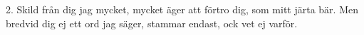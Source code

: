 2.  Skild från dig jag mycket, mycket äger
    att förtro dig, som mitt järta bär.
    Men bredvid dig ej ett ord jag säger,
    stammar endast, ock vet ej varför.
